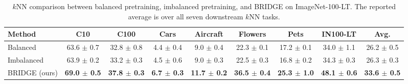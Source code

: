 \begin{table}[t]
\centering
\tiny
\setlength{\tabcolsep}{3.0pt}
\caption{$k$NN comparison between balanced pretraining, imbalanced pretraining, and BRIDGE on ImageNet-100-LT. The reported average is over all seven downstream $k$NN tasks.}
\label{tab:main_baselines_knn}
\begin{adjustbox}{max width=\textwidth}
\begin{tabular}{l c c c c c c c c}
\toprule
Method & C10 & C100 & Cars & Aircraft & Flowers & Pets & IN100-LT & Avg. \\
\midrule
Balanced & 63.6 {\scriptsize$\pm$ 0.7} & 32.8 {\scriptsize$\pm$ 0.8} & 4.4 {\scriptsize$\pm$ 0.4} & 9.0 {\scriptsize$\pm$ 0.4} & 22.3 {\scriptsize$\pm$ 0.1} & 17.2 {\scriptsize$\pm$ 0.1} & 34.0 {\scriptsize$\pm$ 1.1} & 26.2 {\scriptsize$\pm$ 0.5} \\
Imbalanced & 63.9 {\scriptsize$\pm$ 0.2} & 33.2 {\scriptsize$\pm$ 0.3} & 4.5 {\scriptsize$\pm$ 0.6} & 9.0 {\scriptsize$\pm$ 0.3} & 22.5 {\scriptsize$\pm$ 0.3} & 16.8 {\scriptsize$\pm$ 0.2} & 34.3 {\scriptsize$\pm$ 0.3} & 26.3 {\scriptsize$\pm$ 0.3} \\
\rowcolor{blue!10} BRIDGE (ours) & \textbf{69.0 {\scriptsize$\pm$ 0.5}} & \textbf{37.8 {\scriptsize$\pm$ 0.3}} & \textbf{6.7 {\scriptsize$\pm$ 0.3}} & \textbf{11.7 {\scriptsize$\pm$ 0.2}} & \textbf{36.5 {\scriptsize$\pm$ 0.4}} & \textbf{25.3 {\scriptsize$\pm$ 1.0}} & \textbf{48.1 {\scriptsize$\pm$ 0.6}} & \textbf{33.6 {\scriptsize$\pm$ 0.5}} \\
\bottomrule
\end{tabular}
\end{adjustbox}
\end{table}
